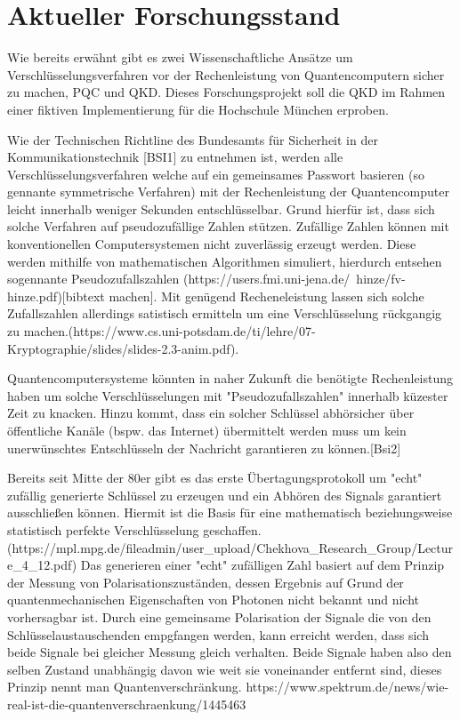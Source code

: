 \chapter{Aktueller Forschungsstand}\label{forschungsstand}
Wie bereits erwähnt gibt es zwei Wissenschaftliche Ansätze um Verschlüsselungsverfahren vor der Rechenleistung von Quantencomputern sicher zu machen, \ac{PQC} und \ac{QKD}. Dieses Forschungsprojekt soll die \ac{QKD} im Rahmen einer fiktiven Implementierung für die Hochschule München erproben.

Wie der Technischen Richtline des Bundesamts für Sicherheit in der Kommunikationstechnik [BSI1] zu entnehmen ist, werden alle Verschlüsselungsverfahren welche auf ein gemeinsames Passwort basieren (so gennante symmetrische Verfahren) mit der Rechenleistung der Quantencomputer leicht innerhalb weniger Sekunden entschlüsselbar.
Grund hierfür ist, dass sich solche Verfahren auf pseudozufällige Zahlen stützen. Zufällige Zahlen können mit konventionellen Computersystemen nicht zuverlässig erzeugt werden. Diese werden mithilfe von mathematischen Algorithmen simuliert, hierdurch entsehen sogennante Pseudozufallszahlen (https://users.fmi.uni-jena.de/~hinze/fv-hinze.pdf)[bibtext machen].
Mit genügend Recheneleistung lassen sich solche Zufallszahlen allerdings satistisch ermitteln um eine Verschlüsselung rückgangig zu machen.(https://www.cs.uni-potsdam.de/ti/lehre/07-Kryptographie/slides/slides-2.3-anim.pdf).

Quantencomputersysteme könnten in naher Zukunft die benötigte Rechenleistung haben um solche Verschlüsselungen mit "Pseudozufallszahlen" innerhalb küzester Zeit zu knacken. Hinzu kommt, dass ein solcher Schlüssel abhörsicher über öffentliche Kanäle (bspw. das Internet) übermittelt werden muss um kein unerwünschtes Entschlüsseln der Nachricht garantieren zu können.[Bsi2]

Bereits seit Mitte der 80er gibt es das erste Übertagungsprotokoll um "echt" zufällig generierte Schlüssel zu erzeugen und ein Abhören des Signals garantiert ausschließen können.
Hiermit ist die Basis für eine mathematisch beziehungsweise statistisch perfekte Verschlüsselung geschaffen.(https://mpl.mpg.de/fileadmin/user_upload/Chekhova_Research_Group/Lecture_4_12.pdf) Das generieren einer "echt" zufälligen Zahl basiert auf dem Prinzip der Messung von Polarisationszuständen, dessen Ergebnis auf Grund der quantenmechanischen Eigenschaften von Photonen nicht bekannt und nicht vorhersagbar ist. Durch eine gemeinsame Polarisation der Signale die von den Schlüsselaustauschenden empgfangen werden, kann erreicht werden, dass sich beide Signale bei gleicher Messung gleich verhalten. Beide Signale haben also den selben Zustand unabhängig davon wie weit sie voneinander entfernt sind, dieses Prinzip nennt man Quantenverschränkung.
https://www.spektrum.de/news/wie-real-ist-die-quantenverschraenkung/1445463


